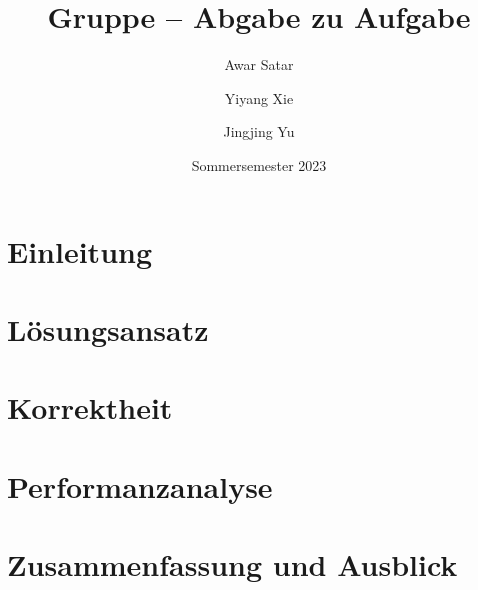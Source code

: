 \documentclass[course=erap]{aspdoc}
\author{Awar Satar \and Yiyang Xie \and Jingjing Yu}
\date{Sommersemester 2023} %
\title{Gruppe \theGroup{} -- Abgabe zu Aufgabe \theNumber}
\begin{document}
\maketitle

\section{Einleitung}



\section{Lösungsansatz}



\section{Korrektheit}


\section{Performanzanalyse} 


\goodbreak
\section{Zusammenfassung und Ausblick}



{}
\end{document}
